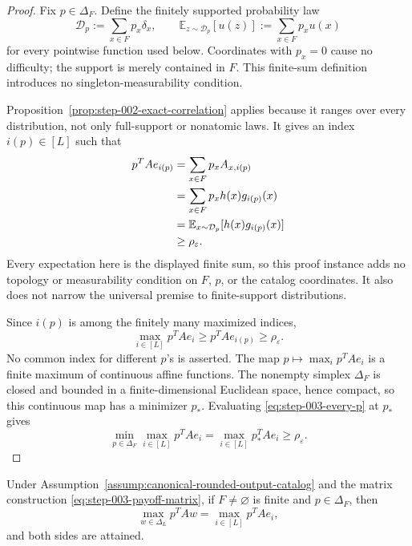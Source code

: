 \begin{proof}
Fix \(p\in\Delta_F\).  Define the finitely supported probability law
\begin{equation}
\mathcal D_p:=\sum_{x\in F}p_x\delta_x,
\qquad
\mathbb E_{z\sim\mathcal D_p}[u(z)]
:=\sum_{x\in F}p_xu(x)
\label{eq:step-003-finite-law}
\end{equation}
for every pointwise function used below.  Coordinates with \(p_x=0\) cause
no difficulty; the support is merely contained in \(F\).  This finite-sum
definition introduces no singleton-measurability condition.

Proposition~\ref{prop:step-002-exact-correlation} applies because it ranges
over every distribution, not only full-support or nonatomic laws.  It gives
an index \(i(p)\in[L]\) such that
\begin{align}
p^{T}Ae_{i(p)}
&=\sum_{x\in F}p_xA_{x,i(p)} \notag\\
&=\sum_{x\in F}p_xh(x)g_{i(p)}(x) \notag\\
&=\mathbb E_{x\sim\mathcal D_p}[h(x)g_{i(p)}(x)] \notag\\
&\ge\rho_{\varepsilon}.
\label{eq:step-003-finite-correlation}
\end{align}
Every expectation here is the displayed finite sum, so this proof instance
adds no topology or measurability condition on \(F\), \(p\), or the catalog
coordinates.  It also does not narrow the universal premise to finite-support
distributions.

Since \(i(p)\) is among the finitely many maximized indices,
\begin{equation}
\max_{i\in[L]}p^{T}Ae_i
\ge p^{T}Ae_{i(p)}
\ge\rho_{\varepsilon}.
\label{eq:step-003-every-p}
\end{equation}
No common index for different \(p\)'s is asserted.  The map
\(p\mapsto\max_i p^{T}Ae_i\) is a finite maximum of continuous affine
functions.  The nonempty simplex \(\Delta_F\) is closed and bounded in a
finite-dimensional Euclidean space, hence compact, so this continuous map
has a minimizer \(p_*\).  Evaluating \eqref{eq:step-003-every-p} at \(p_*\)
gives
\[
\min_{p\in\Delta_F}\max_{i\in[L]}p^{T}Ae_i
=\max_{i\in[L]}p_*^{T}Ae_i
\ge\rho_{\varepsilon}.
\]
\end{proof}

\begin{lemma}
\label{lem:step-003-column-vertices}
Under Assumption~\ref{assump:canonical-rounded-output-catalog} and the matrix
construction \eqref{eq:step-003-payoff-matrix}, if \(F\ne\varnothing\) is
finite and \(p\in\Delta_F\), then
\begin{equation}
\max_{w\in\Delta_L}p^{T}Aw
=\max_{i\in[L]}p^{T}Ae_i,
\label{eq:step-003-column-identity}
\end{equation}
and both sides are attained.
\end{lemma}

